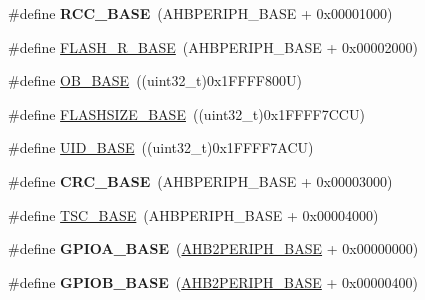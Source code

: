 \begin{DoxyCompactItemize}
\item 
\mbox{\label{group___peripheral__memory__map_ga0e681b03f364532055d88f63fec0d99d}} 
\#define {\bfseries R\+C\+C\+\_\+\+B\+A\+SE}~(A\+H\+B\+P\+E\+R\+I\+P\+H\+\_\+\+B\+A\+SE + 0x00001000)
\item 
\#define \hyperlink{group___peripheral__memory__map_ga8e21f4845015730c5731763169ec0e9b}{F\+L\+A\+S\+H\+\_\+\+R\+\_\+\+B\+A\+SE}~(A\+H\+B\+P\+E\+R\+I\+P\+H\+\_\+\+B\+A\+SE + 0x00002000)
\item 
\#define \hyperlink{group___peripheral__memory__map_gab5b5fb155f9ee15dfb6d757da1adc926}{O\+B\+\_\+\+B\+A\+SE}~((uint32\+\_\+t)0x1\+F\+F\+F\+F800\+U)
\item 
\#define \hyperlink{group___peripheral__memory__map_ga776d985f2d4d40b588ef6ca9d573af78}{F\+L\+A\+S\+H\+S\+I\+Z\+E\+\_\+\+B\+A\+SE}~((uint32\+\_\+t)0x1\+F\+F\+F\+F7\+C\+C\+U)
\item 
\#define \hyperlink{group___peripheral__memory__map_ga664eda42b83c919b153b07b23348be67}{U\+I\+D\+\_\+\+B\+A\+SE}~((uint32\+\_\+t)0x1\+F\+F\+F\+F7\+A\+C\+U)
\item 
\mbox{\label{group___peripheral__memory__map_ga656a447589e785594cbf2f45c835ad7e}} 
\#define {\bfseries C\+R\+C\+\_\+\+B\+A\+SE}~(A\+H\+B\+P\+E\+R\+I\+P\+H\+\_\+\+B\+A\+SE + 0x00003000)
\item 
\#define \hyperlink{group___peripheral__memory__map_ga2bba7a31caeacaacd433abb71781e0af}{T\+S\+C\+\_\+\+B\+A\+SE}~(A\+H\+B\+P\+E\+R\+I\+P\+H\+\_\+\+B\+A\+SE + 0x00004000)
\item 
\mbox{\label{group___peripheral__memory__map_gad7723846cc5db8e43a44d78cf21f6efa}} 
\#define {\bfseries G\+P\+I\+O\+A\+\_\+\+B\+A\+SE}~(\hyperlink{group___peripheral__memory__map_gaeedaa71d22a1948492365e2cd26cfd46}{A\+H\+B2\+P\+E\+R\+I\+P\+H\+\_\+\+B\+A\+SE} + 0x00000000)
\item 
\mbox{\label{group___peripheral__memory__map_gac944a89eb789000ece920c0f89cb6a68}} 
\#define {\bfseries G\+P\+I\+O\+B\+\_\+\+B\+A\+SE}~(\hyperlink{group___peripheral__memory__map_gaeedaa71d22a1948492365e2cd26cfd46}{A\+H\+B2\+P\+E\+R\+I\+P\+H\+\_\+\+B\+A\+SE} + 0x00000400)
\item 
\mbox{\label{group___peripheral__memory__map_ga26f267dc35338eef219544c51f1e6b3f}} 

\end{DoxyCompactItemize}
